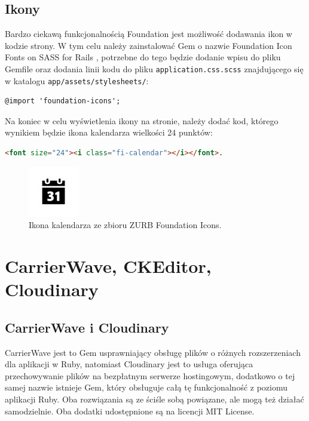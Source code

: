 \documentclass[openright]{xmgr}
\begin{document}
\subsection{Ikony}
Bardzo ciekawą funkcjonalnością Foundation jest możliwość dodawania ikon w kodzie strony. W tym celu należy zainstalować Gem o nazwie Foundation Icon Fonts on SASS for Rails \cite{icons}, potrzebne do tego będzie dodanie wpisu do pliku Gemfile oraz dodania linii kodu do pliku \texttt{application.css.scss} znajdującego się w katalogu \texttt{app/assets/stylesheets/}:
\begin{lstlisting}[language=ruby2, caption={Kod dołączający zbiór ikon Foundation Icons do aplikacji}]
@import 'foundation-icons';
\end{lstlisting}
Na koniec w celu wyświetlenia ikony na stronie, należy dodać kod, którego wynikiem będzie ikona kalendarza wielkości 24 punktów:
\begin{lstlisting}[language=html, caption={Przykładowa ikona ze zbioru ikon Foundation Icons}]
<font size="24"><i class="fi-calendar"></i></font>.
\end{lstlisting}

\begin{figure}[!tbh]
\centering
\includegraphics{fig/icon}
\caption{Ikona kalendarza ze zbioru ZURB Foundation Icons.}
\end{figure}

\newpage

\section{CarrierWave, CKEditor, Cloudinary}
\subsection{CarrierWave i Cloudinary}
CarrierWave \cite{carrierwave} jest to Gem usprawniający obsługę plików o różnych rozszerzeniach dla aplikacji w Ruby, natomiast Cloudinary jest to usługa oferująca przechowywanie plików na bezpłatnym serwerze hostingowym, dodatkowo o tej samej nazwie istnieje Gem, który obsługuje całą tę funkcjonalność z poziomu aplikacji Ruby. Oba rozwiązania są ze ściśle sobą powiązane, ale mogą też działać samodzielnie. Oba dodatki udostępnione są na licencji MIT License.
\end{document}
